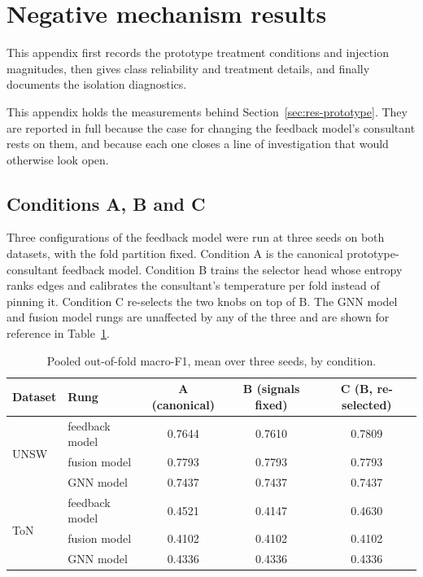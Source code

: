 \appendix

\section{Negative mechanism results}
\label{app:negative}

This appendix first records the prototype treatment conditions and injection magnitudes, then gives class reliability and treatment details, and finally documents the isolation diagnostics.

This appendix holds the measurements behind Section~\ref{sec:res-prototype}. They are
reported in full because the case for changing the feedback model's consultant rests on them, and
because each one closes a line of investigation that would otherwise look open.

\FloatBarrier
\subsection{Conditions A, B and C}
\label{app:abc}

Three configurations of the feedback model were run at three seeds on both datasets, with the fold
partition fixed. Condition A is the canonical prototype-consultant feedback model. Condition B trains
the selector head whose entropy ranks edges and calibrates the consultant's temperature per
fold instead of pinning it. Condition C re-selects the two knobs on top of B. The GNN model and fusion model rungs are unaffected by any of the three and are shown for reference in
Table~\ref{tab:abc}.

\begin{table}[htbp]
\centering
\caption[Pooled out-of-fold macro-F1, mean over three seeds, by condition]{Pooled out-of-fold macro-F1, mean over three seeds, by condition.}
\label{tab:abc}
\small
\begin{tabular}{llccc}
\toprule
Dataset & Rung & A (canonical) & B (signals fixed) & C (B, re-selected) \\
\midrule
\multirow{3}{*}{UNSW}
 & feedback model          & 0.7644 & 0.7610 & 0.7809 \\
 & fusion model          & 0.7793 & 0.7793 & 0.7793 \\
 & GNN model & 0.7437 & 0.7437 & 0.7437 \\
\midrule
\multirow{3}{*}{ToN}
 & feedback model          & 0.4521 & 0.4147 & 0.4630 \\
 & fusion model          & 0.4102 & 0.4102 & 0.4102 \\
 & GNN model & 0.4336 & 0.4336 & 0.4336 \\
\bottomrule
\end{tabular}
\end{table}

